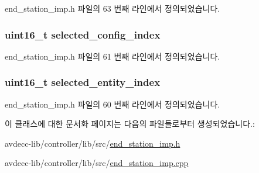 end\+\_\+station\+\_\+imp.\+h 파일의 63 번째 라인에서 정의되었습니다.

\subsubsection[{\texorpdfstring{selected\+\_\+config\+\_\+index}{selected_config_index}}]{\setlength{\rightskip}{0pt plus 5cm}uint16\+\_\+t selected\+\_\+config\+\_\+index\hspace{0.3cm}{\ttfamily [private]}}\hypertarget{classavdecc__lib_1_1end__station__imp_a6c67b72a9169716135fa381869fe6bd7}{}\label{classavdecc__lib_1_1end__station__imp_a6c67b72a9169716135fa381869fe6bd7}


end\+\_\+station\+\_\+imp.\+h 파일의 61 번째 라인에서 정의되었습니다.

\subsubsection[{\texorpdfstring{selected\+\_\+entity\+\_\+index}{selected_entity_index}}]{\setlength{\rightskip}{0pt plus 5cm}uint16\+\_\+t selected\+\_\+entity\+\_\+index\hspace{0.3cm}{\ttfamily [private]}}\hypertarget{classavdecc__lib_1_1end__station__imp_ad6eff78fc51bad1b962873657f069eaa}{}\label{classavdecc__lib_1_1end__station__imp_ad6eff78fc51bad1b962873657f069eaa}


end\+\_\+station\+\_\+imp.\+h 파일의 60 번째 라인에서 정의되었습니다.



이 클래스에 대한 문서화 페이지는 다음의 파일들로부터 생성되었습니다.\+:\begin{DoxyCompactItemize}
\item 
avdecc-\/lib/controller/lib/src/\hyperlink{end__station__imp_8h}{end\+\_\+station\+\_\+imp.\+h}\item 
avdecc-\/lib/controller/lib/src/\hyperlink{end__station__imp_8cpp}{end\+\_\+station\+\_\+imp.\+cpp}\end{DoxyCompactItemize}
